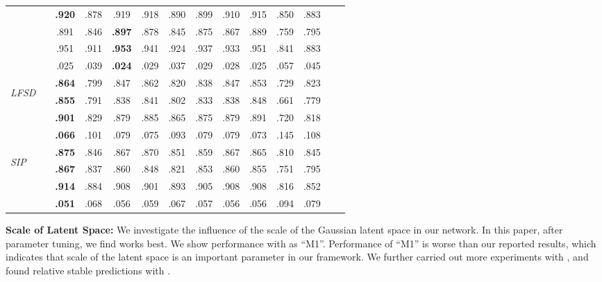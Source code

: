 \documentclass[10pt,twocolumn,letterpaper]{article}
\begin{document}
\begin{table}[t!]
\begin{tabular}{lr|cccccccccccc}
    &  & \textbf{.920}   & .878 & .919 & .918 & .890  & .899 & .910 & .915& .850 & .883  \\
    &   & .891     & .846 & \textbf{.897} & .878 & .845  & .875 & .867 & .889 & .759 & .795    \\
    &      & .951    & .911 & \textbf{.953} & .941 & .924  & .937 & .933 & .951 & .841 & .883   \\
    &  & .025  & .039 & \textbf{.024} & .029 & .037 & .029  & .028 & .025 & .057 & .045 \\ \hline
\multirow{4}{*}{\begin{sideways}\textit{LFSD} \cite{li2014saliency}\end{sideways}}
    &  & \textbf{.864}   & .799 & .847 & .862 & .820  & .838 & .847 & .853 & .729& .823 \\
    &    & \textbf{.855}    & .791 & .838 & .841  & .802 & .833  & .838 & .848& .661& .779   \\
    &     & \textbf{.901}     & .829 & .879 & .885 & .865 & .875  & .879 & .891 & .720& .818  \\
    &  & \textbf{.066}  & .101 & .079 & .075 & .093 & .079  & .079 & .073  & .145& .108\\ \hline
\multirow{4}{*}{\begin{sideways}\textit{SIP} \cite{sip_dataset}\end{sideways}}
    &  & \textbf{.875}   & .846 & .867 & .870 & .851  & .859 & .867 & .865 & .810& .845 \\
    &    & \textbf{.867}    & .837 & .860 & .848 & .821 & .853  & .860 & .855 & .751& .795  \\
    &     & \textbf{.914}     & .884 & .908 & .901 & .893 & .905  & .908 & .908 & .816& .852 \\
    &  & \textbf{.051}  & .068 & .056  & .059 & .067 & .057  & .056 & .056& .094& .079 \\ \hline
\end{tabular}
    \vspace{-4mm}
\end{table} 

\noindent\textbf{Scale of Latent Space:}
We investigate the influence of the scale of the Gaussian latent space  in our network. In this paper, after parameter tuning, we find  works best. We show performance with  as \enquote{M1}. Performance of \enquote{M1} is worse than our reported results, which indicates that scale of the latent space is an important parameter in our framework. We further carried out more experiments with , and found relative stable predictions with . 
\end{document}
